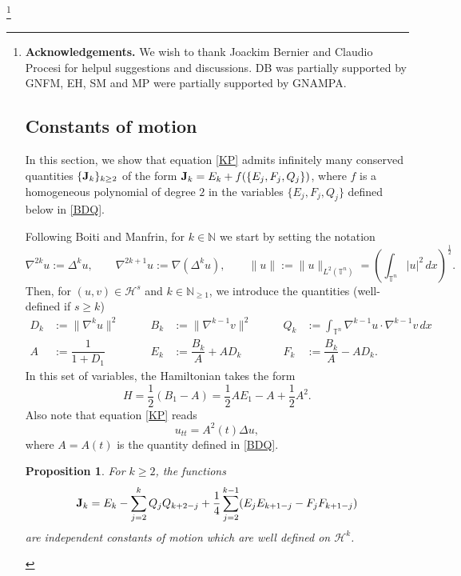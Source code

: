 \documentclass[reqno,11pt]{amsart}
\theoremstyle{plain}
\numberwithin{equation}{section}
\newtheorem{proposition}[theorem]{Proposition}
\newcommand{\N}{\mathbb{N}}
\newcommand{\T}{\mathbb{T}}
\newcommand{\I}{{\texttt{\bf J}}}
\begin{document}
\smallskip
\thanks{{\bf Acknowledgements.} We wish to thank Joackim Bernier and Claudio Procesi for helpul suggestions and discussions. DB was partially supported by GNFM, EH, SM and MP were partially supported by GNAMPA. 

\section{Constants of motion}

In this section, we show that equation \eqref{KP} admits infinitely many conserved quantities $\{\I_k\}_{k\geq2}$  of the form $\I_k=E_k+f(\{E_j, F_j, Q_j\})$, where $f$ is a homogeneous polynomial of degree $2$ in the variables $\{E_j, F_j, Q_j\}$ defined below in \eqref{BDQ}.

Following Boiti and Manfrin, for $k\in\N$ we start by setting the notation
$$
\nabla^{2k} u := \Delta^k u, \qquad \nabla^{2k+1} u := \nabla(\Delta^k u), \qquad \| u \| := \| u \|_{L^2(\T^n)} = \left( \int_{\T^n} |u|^2\, dx \right)^{\frac12}.
$$
Then, for $(u,v)\in{\mathcal H}^s$ and $k\in\N_{\geq1}$, we introduce the quantities (well-defined if $s\geq k$)
\begin{equation}\label{BDQ}
	\begin{aligned}
		D_k&:=\|\nabla^{k}u\|^2\quad\quad&
		B_k&:=\|\nabla^{k-1}v\|^2\quad\quad&
		Q_k&:=\int_{\T^n}\nabla^{k-1}u\cdot\nabla^{k-1}v\,dx\\
		A&:=\dfrac{1}{1+D_1}\quad\quad&
		E_k&:=\dfrac{B_k}{A}+A D_k\quad\quad&
		F_k&:=\dfrac{B_k}{A}-A D_k.
	\end{aligned}
\end{equation}
In this set of variables, the Hamiltonian takes the form
\begin{equation}\label{ham new}
	H=\frac12(B_1-A)=\frac12 AE_1 - A + \frac12 A^2.
\end{equation}
Also note that equation \eqref{KP} reads
\begin{equation}\label{KP A}
	u_{tt} = A^2(t) \Delta u,
\end{equation}
where $A=A(t)$ is the quantity defined in \eqref{BDQ}.
\begin{proposition}\label{costanti!}
	For $k\geq2$, the functions
	\begin{equation}\label{def I}
		\I_k= E_k- \sum_{j=2}^k Q_j Q_{k+2-j} + \frac14 \sum_{j=2}^{k-1}(E_j E_{k+1-j}-F_j F_{k+1-j})
	\end{equation}
	are independent constants of motion which are well defined on $\mathcal H^k$.
\end{proposition}

}
\end{document}
